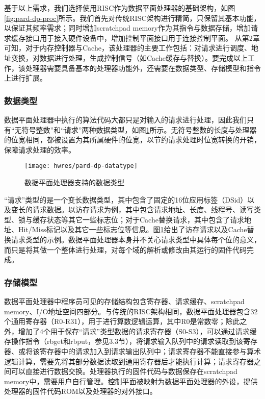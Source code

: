 基于以上需求，我们选择使用RISC作为数据平面处理器的基础架构，如图\ref{fig:pard-dp-proc}所示。我们首先对传统RISC架构进行精简，只保留其基本功能，以保证其频率需求；同时增加scratchpad memory作为其指令与数据存储，增加请求缓存接口用于接入硬件设备中，增加控制平面接口用于连接控制平面。
从第2章可知，对于内存控制器与Cache，该处理器的主要工作包括：对请求进行调度、地址变换，对数据进行处理，生成控制信号（如Cache缓存与替换）。要完成以上工作，该处理器需要具备基本的处理器功能外，还需要在数据类型、存储模型和指令上进行扩展。


\subsubsection{数据类型}

数据平面处理器中执行的算法代码大都只是对输入的请求进行处理，因此我们只有``无符号整数''和``请求''两种数据类型，如图\ref{fig:pard-dp-datatype}所示。无符号整数的长度与处理器的位宽相同，都被设置为其所属硬件的位宽，以节约请求处理时位宽转换的开销，保障请求处理的效率。

\begin{figure}[H]
  \centering
  \texttt{[image: hwres/pard-dp-datatype]}
  \caption{数据平面处理器支持的数据类型}
  \label{fig:pard-dp-datatype}
\end{figure}
 
``请求''类型的是一个变长数据类型，其中包含了固定的16位应用标签（DSid）以及变长的请求数据。以访存请求为例，其中包含请求地址、长度、线程号、读写类型、锁与缓存状态等其它一些标志位；对于Cache替换请求，其中包含了请求地址、Hit/Miss标记以及其它一些标志位等信息。图\ref{fig:pard-dp-datatype}给出了访存请求以及Cache替换请求类型的示例。数据平面处理器本身并不关心请求类型中具体每个位的意义，而只是将其做一个整体进行处理，对每个域的解析或修改由其运行的固件代码完成。

\subsubsection{存储模型}
数据平面处理器中程序员可见的存储结构包含寄存器、请求缓存、scratchpad memory、I/O地址空间四部分。与传统的RISC架构相同，数据平面处理器包含32个通用寄存器（R0-R31），用于进行算数逻辑运算，其中R0是常数零；除此之外，增加了4个用于保存``请求''类型数据的请求寄存器（S0-S3），可以通过请求缓存操作指令（rbget和rbput，参见3.3节），将请求输入队列中的请求读取到该寄存器、或将该寄存器中的请求加入到请求输出队列中；请求寄存器不能直接参与算术逻辑计算，需要先将其部分数据读取到通用寄存器后才能执行计算；请求寄存器之间可以直接进行数据交换。处理器执行的固件代码与数据保存在scratchpad memory中，需要用户自行管理。控制平面被映射为数据平面处理器的外设，提供处理器的固件代码ROM以及处理器的对外接口。

